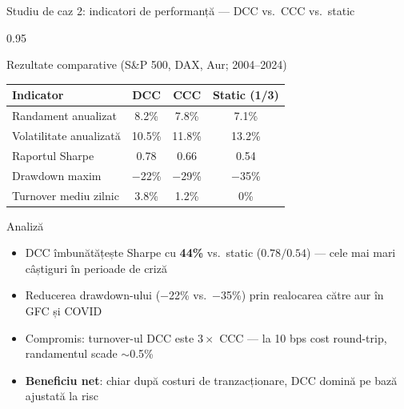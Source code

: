 \documentclass[9pt, aspectratio=169, t]{beamer}
\begin{document}
\begin{frame}{Studiu de caz 2: indicatori de performanță --- DCC vs.\ CCC vs.\ static}
    \begin{cminipage}{0.95\textwidth}
    {\footnotesize
    \begin{block}{Rezultate comparative (S\&P 500, DAX, Aur; 2004--2024)}
        \vspace{0.1cm}
        {\small
        \begin{center}
        \begin{tabular}{l|ccc}
            \hline
            \textbf{Indicator} & \textbf{DCC} & \textbf{CCC} & \textbf{Static (1/3)} \\
            \hline
            Randament anualizat    & 8.2\% & 7.8\% & 7.1\% \\
            Volatilitate anualizată & 10.5\% & 11.8\% & 13.2\% \\
            Raportul Sharpe        & 0.78 & 0.66 & 0.54 \\
            Drawdown maxim         & $-$22\% & $-$29\% & $-$35\% \\
            Turnover mediu zilnic  & 3.8\% & 1.2\% & 0\% \\
            \hline
        \end{tabular}
        \end{center}
        }
    \end{block}
    \begin{alertblock}{Analiză}
        \begin{itemize}\setlength{\itemsep}{0pt}
            \item DCC îmbunătățește Sharpe cu \textbf{44\%} vs.\ static ($0.78/0.54$) --- cele mai mari câștiguri în perioade de criză
            \item Reducerea drawdown-ului ($-$22\% vs.\ $-$35\%) prin realocarea către aur în GFC și COVID
            \item Compromis: turnover-ul DCC este $3\times$ CCC --- la 10 bps cost round-trip, randamentul scade $\sim$0.5\%
            \item \textbf{Beneficiu net}: chiar după costuri de tranzacționare, DCC domină pe bază ajustată la risc
        \end{itemize}
    \end{alertblock}
    }
    \end{cminipage}
\end{frame}
\end{document}
